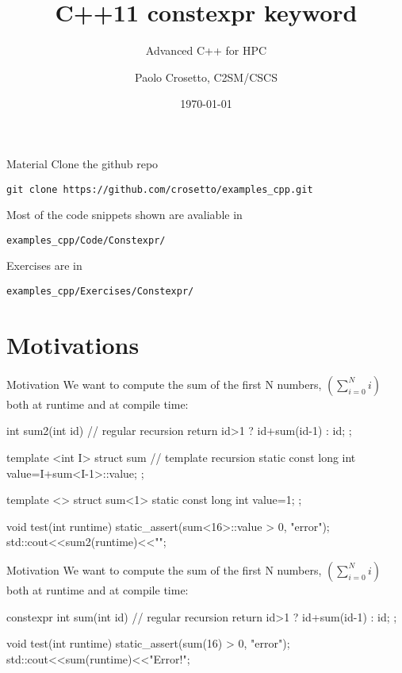\documentclass[aspectratio=43]{beamer}
\author{Paolo Crosetto, C2SM/CSCS}
\title{C++11 constexpr keyword}
\subtitle{Advanced C++ for HPC}
\date{\today}
\begin{document}
\cscstitle



\begin{frame}[fragile]{Material}
  Clone the github repo
\begin{verbatim}
git clone https://github.com/crosetto/examples_cpp.git
\end{verbatim}
  Most of the code snippets shown are avaliable in
\begin{verbatim}
examples_cpp/Code/Constexpr/
\end{verbatim}
  Exercises are in
\begin{verbatim}
examples_cpp/Exercises/Constexpr/
\end{verbatim}
\end{frame}

\section{Motivations}


\begin{frame}[fragile]{Motivation}
  We want to compute the sum of the first N numbers, $\left(\sum_{i=0}^N i\right)$ both at runtime and at compile time:
  \begin{Cpplisting}{}
int sum2(int id){ // regular recursion
  return id>1 ? id+sum(id-1) : id;
};

template <int I>
struct sum{ // template recursion
  static const long int value=I+sum<I-1>::value;
};

template <>
struct sum<1>{
  static const long int value=1;
};

void test(int runtime){
  static_assert(sum<16>::value > 0, "error");
  std::cout<<sum2(runtime)<<"\n";
}
\end{Cpplisting}
\end{frame}

\begin{frame}[fragile]{Motivation}
  We want to compute the sum of the first N numbers, $\left(\sum_{i=0}^N i\right)$ both at runtime and at compile time:
  \begin{Cpplisting}{}
constexpr int sum(int id){ // regular recursion
  return id>1 ? id+sum(id-1) : id;
};











void test(int runtime){
  static_assert(sum(16) > 0, "error");
  std::cout<<sum(runtime)<<"Error!\n";
}
\end{Cpplisting}

\end{frame}
\end{document}
